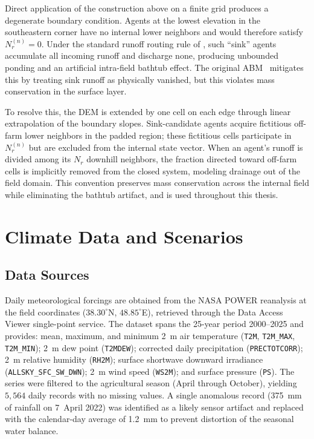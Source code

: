 Direct application of the construction above on a finite grid produces a
degenerate boundary condition. Agents at the lowest elevation in the
southeastern corner have no internal lower neighbors and would therefore
satisfy $N_r^{(n)} = 0$. Under the standard runoff routing rule of
\cite{Lopezjimenez2024}, such ``sink'' agents accumulate all incoming
runoff and discharge none, producing unbounded ponding and an artificial
intra-field bathtub effect. The original ABM~\cite{Lopezjimenez2024}
mitigates this by treating sink runoff as physically vanished, but this
violates mass conservation in the surface layer.

To resolve this, the DEM is extended by one cell on each edge through
linear extrapolation of the boundary slopes. Sink-candidate agents
acquire fictitious off-farm lower neighbors in the padded region; these
fictitious cells participate in $N_r^{(n)}$ but are excluded from the
internal state vector. When an agent's runoff is divided among its $N_r$
downhill neighbors, the fraction directed toward off-farm cells is
implicitly removed from the closed system, modeling drainage out of the
field domain. This convention preserves mass conservation across the
internal field while eliminating the bathtub artifact, and is used
throughout this thesis.

\section{Climate Data and Scenarios}
\label{sec:sys-climate}

\subsection{Data Sources}
\label{ssec:sys-data-sources}

Daily meteorological forcings are obtained from the NASA POWER reanalysis
\cite{nasa-power} at the field coordinates ($38.30^{\circ}$N,
$48.85^{\circ}$E), retrieved through the Data Access Viewer single-point
service. The dataset spans the 25-year period 2000--2025 and provides:
mean, maximum, and minimum 2~m air temperature
(\texttt{T2M}, \texttt{T2M\_MAX}, \texttt{T2M\_MIN});
2~m dew point (\texttt{T2MDEW}); corrected daily precipitation
(\texttt{PRECTOTCORR}); 2~m relative humidity (\texttt{RH2M}); surface
shortwave downward irradiance (\texttt{ALLSKY\_SFC\_SW\_DWN}); 2~m wind
speed (\texttt{WS2M}); and surface pressure (\texttt{PS}). The series
were filtered to the agricultural season (April through October), yielding
$5{,}564$ daily records with no missing values. A single anomalous record
(375~mm of rainfall on 7~April 2022) was identified as a likely sensor
artifact and replaced with the calendar-day average of 1.2~mm to prevent
distortion of the seasonal water balance.

